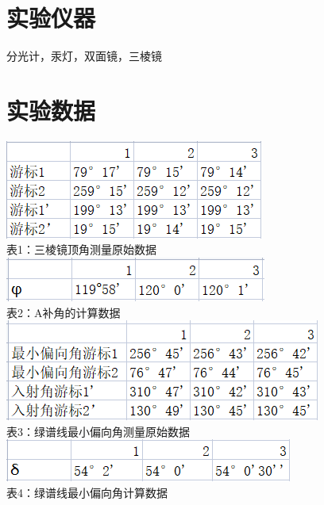 \documentclass{report}
\begin{document}
	\section{实验仪器}
	分光计，汞灯，双面镜，三棱镜
	\section{实验数据}
	\begin{flushleft}
		
	
	\includegraphics{2}	\\表1：三棱镜顶角测量原始数据\\
	\includegraphics{4}\\表2：A补角的计算数据 \\
	\includegraphics{3}\\表3：绿谱线最小偏向角测量原始数据\\
	\includegraphics{5}\\表4：绿谱线最小偏向角计算数据\\
\end{flushleft}
	
\end{document}
